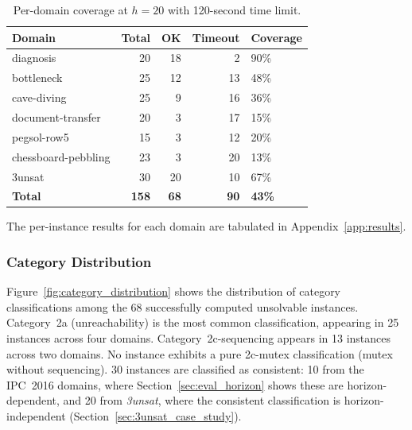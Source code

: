 \begin{table}[ht]
    \centering
    \begin{tabular}{lrrrl}
        \toprule
        \textbf{Domain}     & \textbf{Total} & \textbf{OK} & \textbf{Timeout} & \textbf{Coverage} \\
        \midrule
        diagnosis           & 20             & 18          & 2                & 90\%              \\
        bottleneck          & 25             & 12          & 13               & 48\%              \\
        cave-diving         & 25             & 9           & 16               & 36\%              \\
        document-transfer   & 20             & 3           & 17               & 15\%              \\
        pegsol-row5         & 15             & 3           & 12               & 20\%              \\
        chessboard-pebbling & 23             & 3           & 20               & 13\%              \\
        3unsat              & 30             & 20          & 10               & 67\%              \\
        \midrule
        \textbf{Total}      & \textbf{158}   & \textbf{68} & \textbf{90}      & \textbf{43\%}     \\
        \bottomrule
    \end{tabular}
    \caption{Per-domain coverage at $h = 20$ with 120-second time limit.}
    \label{tab:coverage}
\end{table}

The per-instance results for each domain are tabulated in Appendix~\ref{app:results}.

\subsubsection{Category Distribution}

Figure~\ref{fig:category_distribution} shows the distribution of category classifications among the 68 successfully computed unsolvable instances. Category~2a (unreachability) is the most common classification, appearing in 25 instances across four domains. Category~2c-sequencing appears in 13 instances across two domains. No instance exhibits a pure 2c-mutex classification (mutex without sequencing). 30 instances are classified as consistent: 10 from the \ac{IPC}~2016 domains, where Section~\ref{sec:eval_horizon} shows these are horizon-dependent, and 20 from \textit{3unsat}, where the consistent classification is horizon-independent (Section~\ref{sec:3unsat_case_study}).

